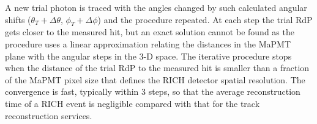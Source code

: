 A new trial photon is traced with the angles changed by such calculated angular shifts ($\theta_T + \Delta \theta$,
$\phi_T + \Delta \phi$) and the procedure repeated. At each step the trial RdP gets closer to the measured hit, but
an exact solution cannot be found as the procedure uses a linear approximation relating the distances in the MaPMT
plane with the angular steps in the 3-D space. The iterative procedure stops when the distance of the trial RdP to the
measured hit is smaller than a fraction of the MaPMT pixel size that defines the RICH detector spatial resolution.
The convergence is fast, typically within 3 steps, so that the average reconstruction time of a RICH event is 
negligible compared with that for the track reconstruction services.


